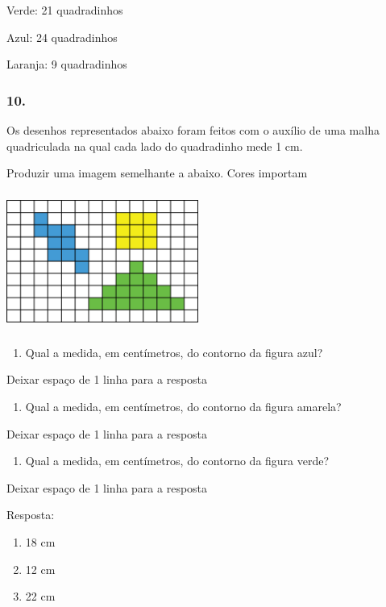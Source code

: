 Verde: 21 quadradinhos

Azul: 24 quadradinhos

Laranja: 9 quadradinhos

\subsubsection{10.}\label{section-73}

Os desenhos representados abaixo foram feitos com o auxílio de uma malha
quadriculada na qual cada lado do quadradinho mede 1 cm.

Produzir uma imagem semelhante a abaixo. Cores importam

\includegraphics[width=2.47521in,height=1.77515in]{media/image57.png}

\begin{enumerate}
\def\labelenumi{\alph{enumi})}
\item
  Qual a medida, em centímetros, do contorno da figura azul?
\end{enumerate}

Deixar espaço de 1 linha para a resposta

\begin{enumerate}
\def\labelenumi{\alph{enumi})}
\item
  Qual a medida, em centímetros, do contorno da figura amarela?
\end{enumerate}

Deixar espaço de 1 linha para a resposta

\begin{enumerate}
\def\labelenumi{\alph{enumi})}
\item
  Qual a medida, em centímetros, do contorno da figura verde?
\end{enumerate}

Deixar espaço de 1 linha para a resposta

Resposta:

\begin{enumerate}
\def\labelenumi{\alph{enumi})}
\item
  18 cm
\item
  12 cm
\item
  22 cm
\end{enumerate}


